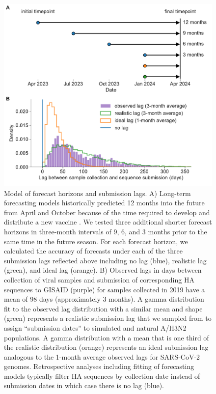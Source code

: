 \documentclass[9pt,lineno]{elife}
\begin{document}
\begin{figure}[htb!]
\includegraphics[width=\linewidth]{figures/distribution_of_delays_and_horizons}
\caption{Model of forecast horizons and submission lags.
  A) Long-term forecasting models historically predicted 12 months into the future from April and October because of the time required to develop and distribute a new vaccine \citep{Luksza:2014hj}.
  We tested three additional shorter forecast horizons in three-month intervals of 9, 6, and 3 months prior to the same time in the future season.
  For each forecast horizon, we calculated the accuracy of forecasts under each of the three submission lags reflected above including no lag (blue), realistic lag (green), and ideal lag (orange).
  B) Observed lags in days between collection of viral samples and submission of corresponding HA sequences to GISAID (purple) for samples collected in 2019 have a mean of 98 days (approximately 3 months).
  A gamma distribution fit to the observed lag distribution with a similar mean and shape (green) represents a realistic submission lag that we sampled from to assign ``submission dates'' to simulated and natural A/H3N2 populations.
  A gamma distribution with a mean that is one third of the realistic distribution (orange) represents an ideal submission lag analogous to the 1-month average observed lags for SARS-CoV-2 genomes.
  Retrospective analyses including fitting of forecasting models typically filter HA sequences by collection date instead of submission dates in which case there is no lag (blue).
}
\end{figure}
\end{document}
